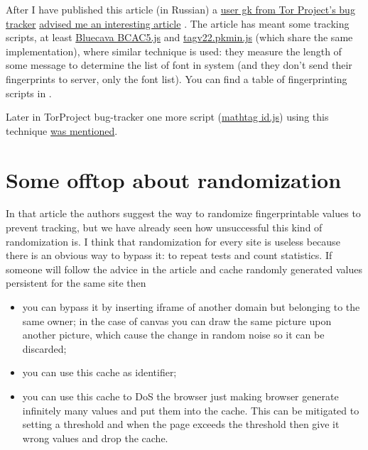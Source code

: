 \documentclass[letterpaper,14pt]{article}
\begin{document}
After I have published this article (in Russian) a \href{https://trac.torproject.org/projects/tor/query?reporter=gk}{user gk from  Tor Project's bug tracker} \href{https://trac.torproject.org/projects/tor/ticket/14310\#comment:3}{advised me an interesting article} \cite{Nikiforakis2014}. The article has meant some tracking scripts, at least \href{http://ds.bluecava.com/v50/AC/BCAC5.js}{Bluecava BCAC5.js} and \href{http://tags.master-perf-tools.com/V20test/tagv22.pkmin.js}{tagv22.pkmin.js} (which share the same implementation), where similar technique is used: they measure the length of some message to determine the list of font in system (and they don't send their fingerprints to server, only the font list). You can find a table of fingerprinting scripts in \cite{Acar2013,Acar2014}.

Later in TorProject bug-tracker one more script (\href{https://mathid.mathtag.com/device/id.js}{mathtag id.js}) using this technique \href{https://trac.torproject.org/projects/tor/ticket/13400#comment:15}{was mentioned}.

\section{Some offtop about randomization}\label{some-offtop-about-randomization}

In that article the authors suggest the way to randomize fingerprintable values to prevent tracking, but we have already seen how unsuccessful this kind of randomization is. I think that randomization for every site is useless because there is an obvious way to bypass it: to repeat tests and count statistics. If someone will follow the advice in the article and cache randomly generated values persistent for the same site then

\begin{itemize}
\itemsep1pt\parskip0pt
\item
  you can bypass it by inserting iframe of another domain but belonging to the same owner; in the case of canvas you can draw the same picture upon another picture, which cause the change in random noise so it can be discarded;
\item
  you can use this cache as identifier;
\item
  you can use this cache to DoS the browser just making browser generate infinitely many values and put them into the cache. This can be mitigated to setting a threshold and when the page exceeds the threshold then give it wrong values and drop the cache.
\end{itemize}
\end{document}

